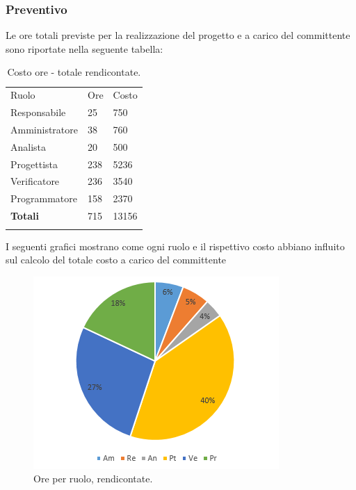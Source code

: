 \documentclass[a4paper]{article}
\begin{document}
			\subsubsection{Preventivo}
				Le ore totali previste per la realizzazione del progetto e a carico del committente sono riportate 
				nella seguente tabella:
				\begin{table}[H]
					\begin{tabularx}{\textwidth}{Y Y Y}
						Ruolo & Ore & Costo \\
						Responsabile & 25 & 750 \\
						Amministratore & 38 & 760 \\
						Analista & 20 & 500\\
						Progettista & 238 & 5236\\
						Verificatore & 236 & 3540\\
						Programmatore & 158 & 2370 \\
						\textbf{Totali} & 715 & 13156 \\
					\end{tabularx}
				\caption{Costo ore - totale rendicontate.}
				\label{TCRendicontati}
				\end{table}
				I seguenti grafici mostrano come ogni ruolo e il rispettivo costo abbiano influito sul calcolo del totale 
				costo a carico del committente
				\begin{figure}[H]
					\centering
					\includegraphics[scale=0.7]{pc_rendicontate}
					\caption{Ore per ruolo, rendicontate.}
				\end{figure}
\end{document}
